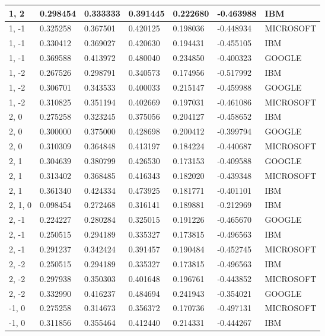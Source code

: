 \documentclass[a4paper,10pt]{article}
\begin{document}
\begin{tabular}{|l|l|l|l|l|l|l|}
1, 2 & 0.298454 & 0.333333 & 0.391445 & 0.222680 & -0.463988 & IBM \\ \hline
1, -1 & 0.325258 & 0.367501 & 0.420125 & 0.198036 & -0.448934 & MICROSOFT \\ \hline
1, -1 & 0.330412 & 0.369027 & 0.420630 & 0.194431 & -0.455105 & IBM \\ \hline
1, -1 & 0.369588 & 0.413972 & 0.480040 & 0.234850 & -0.400323 & GOOGLE \\ \hline
1, -2 & 0.267526 & 0.298791 & 0.340573 & 0.174956 & -0.517992 & IBM \\ \hline
1, -2 & 0.306701 & 0.343533 & 0.400033 & 0.215147 & -0.459988 & GOOGLE \\ \hline
1, -2 & 0.310825 & 0.351194 & 0.402669 & 0.197031 & -0.461086 & MICROSOFT \\ \hline
2, 0 & 0.275258 & 0.323245 & 0.375056 & 0.204127 & -0.458652 & IBM \\ \hline
2, 0 & 0.300000 & 0.375000 & 0.428698 & 0.200412 & -0.399794 & GOOGLE \\ \hline
2, 0 & 0.310309 & 0.364848 & 0.413197 & 0.184224 & -0.440687 & MICROSOFT \\ \hline
2, 1 & 0.304639 & 0.380799 & 0.426530 & 0.173153 & -0.409588 & GOOGLE \\ \hline
2, 1 & 0.313402 & 0.368485 & 0.416343 & 0.182020 & -0.439348 & MICROSOFT \\ \hline
2, 1 & 0.361340 & 0.424334 & 0.473925 & 0.181771 & -0.401101 & IBM \\ \hline
2, 1, 0 & 0.098454 & 0.272468 & 0.316141 & 0.189881 & -0.212969 & IBM \\ \hline
2, -1 & 0.224227 & 0.280284 & 0.325015 & 0.191226 & -0.465670 & GOOGLE \\ \hline
2, -1 & 0.250515 & 0.294189 & 0.335327 & 0.173815 & -0.496563 & IBM \\ \hline
2, -1 & 0.291237 & 0.342424 & 0.391457 & 0.190484 & -0.452745 & MICROSOFT \\ \hline
2, -2 & 0.250515 & 0.294189 & 0.335327 & 0.173815 & -0.496563 & IBM \\ \hline
2, -2 & 0.297938 & 0.350303 & 0.401648 & 0.196761 & -0.443852 & MICROSOFT \\ \hline
2, -2 & 0.332990 & 0.416237 & 0.484694 & 0.241943 & -0.354021 & GOOGLE \\ \hline
-1, 0 & 0.275258 & 0.314673 & 0.356372 & 0.170736 & -0.497131 & MICROSOFT \\ \hline
-1, 0 & 0.311856 & 0.355464 & 0.412440 & 0.214331 & -0.444267 & IBM \\ \hline

\end{tabular}
\end{document}
